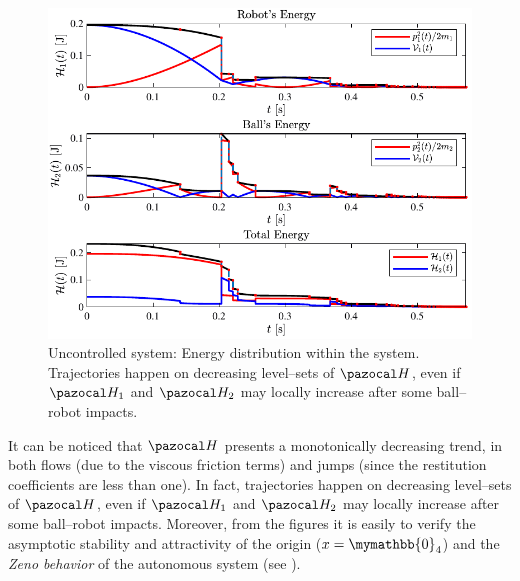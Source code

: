 %
\begin{figure}[h]
	\centering
	\includegraphics[width=\linewidth]{Figures/aut4.pdf}
	\caption[Uncontrolled system: Energy distribution within the system.]{Uncontrolled system: Energy distribution within the system. Trajectories happen on decreasing level--sets of $\Ha$, even if $\Ha_1$ and $\Ha_2$ may locally increase after some ball--robot impacts.}
	\label{fig:aut4}
\end{figure}
%
%
It can be noticed that $\Ha$ presents a monotonically decreasing trend, in both flows (due to the viscous friction terms) and jumps (since the restitution coefficients are less than one). In fact, trajectories happen on decreasing level--sets of $\Ha$, even if $\Ha_1$ and $\Ha_2$ may locally increase after some ball--robot impacts. Moreover, from the figures it is easily to verify the asymptotic stability and attractivity of the origin ($x = \mymathbb{0}_4$) and the \textit{Zeno behavior} of the autonomous system (see \cite{goebel2009hybrid}).
